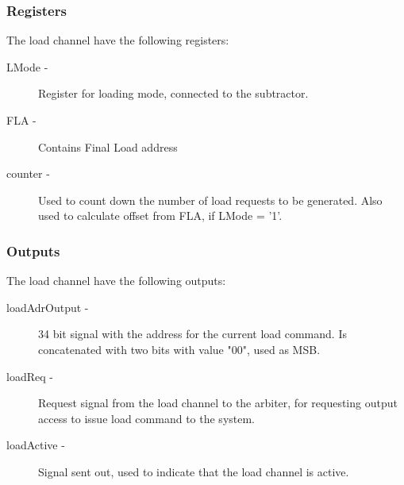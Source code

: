 \begin{appendix}
\subsubsection{Registers}
The load channel have the following registers:

\begin{description}
    \item[LMode -]
    Register for loading mode, connected to the subtractor.
    \item[FLA -]
    Contains Final Load address
    \item[counter -]
    Used to count down the number of load requests to be generated. Also used to calculate offset from FLA, if LMode = '1'.
\end{description}

\subsubsection{Outputs}
The load channel have the following outputs:

\begin{description}
    \item[loadAdrOutput -]
    34 bit signal with the address for the current load command. Is concatenated with two bits with value "00", used as MSB.
    \item[loadReq -]
    Request signal from the load channel to the arbiter, for requesting output access to issue load command to the system.   
    \item[loadActive -]
    Signal sent out, used to indicate that the load channel is active.
\end{description}


\end{appendix}
